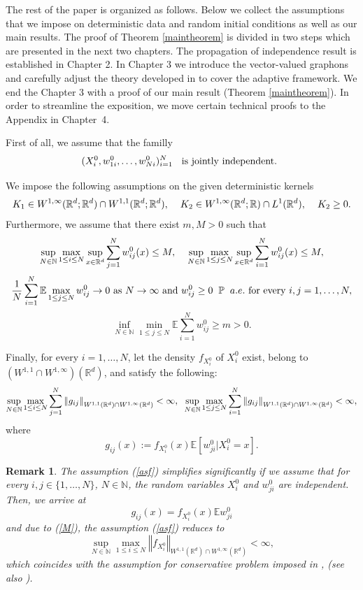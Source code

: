 \documentclass[10pt]{article}
\newtheorem{remark}{Remark}
\newcommand{\eqq}[2]{\begin{equation}  #1  \label{#2}\end{equation}    }
\newcommand{\hd}{\hspace{0.2cm}}
\newcommand{\m}[1]{\mbox{#1}}
\newcommand*{\norm}[1]{\left\Vert{#1}\right\Vert}
\newcommand{\R}{\mathbb{R}}
\newcommand{\p}{\mathbb{P}}
\newcommand{\E}{\mathbb{E}}
\newcommand{\wij}{w_{ij}}
\newcommand{\wji}{w_{ji}}
\begin{document}
The rest of the paper is organized as follows. 
Below we collect the assumptions that we impose on deterministic data and random initial conditions as well as our main results. The proof of Theorem \ref{maintheorem} is divided in two steps which are presented in the next two chapters. The propagation of independence result is established in Chapter 2. In Chapter 3 we introduce the vector-valued graphons and carefully adjust the theory developed in \cite{JPS2025} to cover the adaptive framework. We end the Chapter 3 with a proof of our main result (Theorem \ref{maintheorem}). In order to streamline the exposition, we move certain technical proofs to the Appendix in Chapter~4.   

 First of all, we assume that the familly 
\eqq{ (X_{i}^0,w_{1i}^0,\dots,w_{Ni}^0)_{i=1}^N \hd \m{ is jointly independent. }}{ind}
 
We impose the following assumptions on the given deterministic kernels 
\eqq{K_1 \in W^{1,\infty}(\R^d;\R^d) \cap W^{1,1}(\R^d;\R^d) , \hd \hd K_2 \in W^{1,\infty}(\R^d;\R) \cap L^{1}(\R^d), \hd \hd  K_2 \geq 0.}{asK}
Furthermore, we assume that there exist $m,M > 0$ such that
\eqq{
\sup_{N \in \mathbb{N}}\max_{1\leq i \leq N}\sup_{x\in \R^d}\sum_{j=1}^N\wij^0(x) \leq M, \hd \hd \sup_{N \in \mathbb{N}}\max_{1\leq j \leq N}\sup_{x\in \R^d}\sum_{i=1}^N\wij^0(x) \leq M,
}{M}
\eqq{\frac{1}{N}\sum_{i=1}^N \E \max_{1\leq j \leq N} \wij^0 \rightarrow 0 \m{ as } N\rightarrow \infty \m{ and } \wij^0 \geq 0 \hd \p \hd a.e.  \m{ for every } i,j = 1,\dots, N,}{aswl}
\eqq{
 \inf_{N \in \mathbb{N}}\min_{1\leq j \leq N}\E \sum_{i=1}^N \wij^0 \geq m > 0.
}{Mb}

Finally, for every $i=1,\dots, N$, let the density $f_{X_i^0}$ of $X^0_i$ exist, belong to $(W^{1,1}\cap W^{1,\infty})(\mathbb{R}^d)$, and satisfy the following:
\eqq{
  \sup_{N\in \mathbb{N}}\max_{1\leq i \leq N} \sum_{j=1}^N\norm{g_{ij}}_{W^{1,1}(\R^d)\cap W^{1,\infty}(\R^d)} < \infty, \hd 
  \sup_{N\in \mathbb{N}}\max_{1\leq j \leq N} \sum_{i=1}^N\norm{g_{ij}}_{W^{1,1}(\R^d)\cap W^{1,\infty}(\R^d)} < \infty,
}{asf}
where   
\[
g_{ij}(x):= f_{X^0_i}(x)\E[w_{ji}^0|X_i^0=x].
\]
\begin{remark}
    The assumption (\ref{asf}) simplifies significantly if we assume that for every $i,j \in \{1,\dots, N\}$, $N\in \mathbb{N}$, the random variables $ X^0_i$ and $\wji^0$ are independent. Then,  we arrive at
    \[
    g_{ij}(x) =  f_{X^0_i}(x)  \mathbb{E} \wji^0
    \]
    and due to 
(\ref{M}), the assumption (\ref{asf}) reduces to 
    \[
    \sup_{N\in \mathbb{N}}\max_{1\leq i \leq N} \norm{f_{X^0_i}}_{W^{1,1}(\R^d)\cap W^{1,\infty}(\R^d)} < \infty,
    \]
    which coincides with the assumption for conservative problem imposed in \cite{JPS2025}, (see also \cite{nasza}).
\end{remark}
\end{document}

